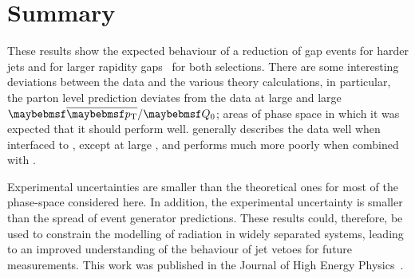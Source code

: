 \section{Summary}
These results show the expected behaviour of a reduction of gap events for
harder jets and for larger rapidity gaps~\cite{Forshaw:2009:JetVeto} for both
selections. There are some interesting deviations between the data and the
various theory calculations, in particular, the parton level \HEJ prediction
deviates from the data at large \DeltaY and large $\pTbar / \Qnought$; areas of
phase space in which it was expected that it should perform well. \Powheg generally describes the data well when interfaced to \Pythia,
except at large \DeltaY, and performs much more poorly when combined with \Herwig.

Experimental uncertainties are smaller than the theoretical ones for most of the
phase-space considered here. In addition, the experimental uncertainty is
smaller than the spread of \MC event generator predictions. These results could,
therefore, be used to constrain the modelling of \QCD radiation in widely
separated \dijet systems, leading to an improved understanding of the behaviour
of jet vetoes for future measurements. This work was published in the Journal of
High Energy Physics~\cite{JHEP:2011:ATLAS_GBJ}.
